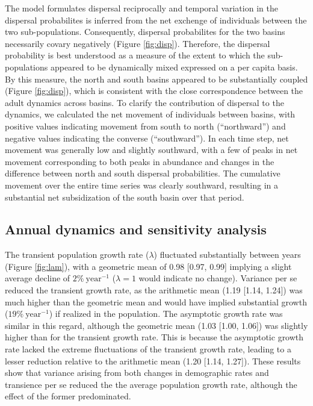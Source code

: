 \documentclass[11pt]{article}
\begin{document}
{The model formulates dispersal reciprocally and temporal variation in the 
dispersal probabilites is inferred from the net exchenge of individuals between
the two sub-populations.
Consequently, dispersal probabilites for the two basins necessarily covary negatively 
(Figure \ref{fig:disp}).
Therefore, the dispersal probability is best understood as a measure of the extent 
to which the sub-populations appeared to be dynamically mixed
expressed on a per capita basis.
By this measure, the north and south basins appeared 
to be substantially coupled (Figure \ref{fig:disp}), 
which is consistent with the close correspondence 
between the adult dynamics across basins.
To clarify the contribution of dispersal to the dynamics, 
we calculated the net movement of individuals between basins,
with positive values indicating movement from south to north (``northward'')
and negative values indicating the converse (``southward'').
In each time step, 
net movement was generally low and slightly southward,
with a few of peaks in net movement corresponding to 
both peaks in abundance
and changes in the difference between north and south dispersal probabilities.
The cumulative movement over the entire time series was clearly southward,
resulting in a substantial net subsidization of the south basin over that period.



\subsection*{Annual dynamics and sensitivity analysis} 

The transient population growth rate ($\lambda$) fluctuated substantially between years
(Figure \ref{fig:lam}),
with a geometric mean of 0.98 [0.97, 0.99] implying a slight average decline
of $2\%~\text{year}^{-1}$ ($\lambda = 1$ would indicate no change).
Variance per se reduced the transient growth rate, 
as the arithmetic mean (1.19 [1.14, 1.24]) was much higher than the geometric mean
and would have implied substantial growth ($19\%~\text{year}^{-1}$)
if realized in the population.
The asymptotic growth rate was similar in this regard,
although the geometric mean (1.03 [1.00, 1.06]) was slightly higher 
than for the transient growth rate.
This is because the asymptotic growth rate lacked the extreme fluctuations 
of the transient growth rate,
leading to a lesser reduction relative to the arithmetic mean (1.20 [1.14, 1.27]).
These results show that variance arising from both changes in demographic
rates and transience per se reduced the the average population growth rate,
although the effect of the former predominated.

}
\end{document}
